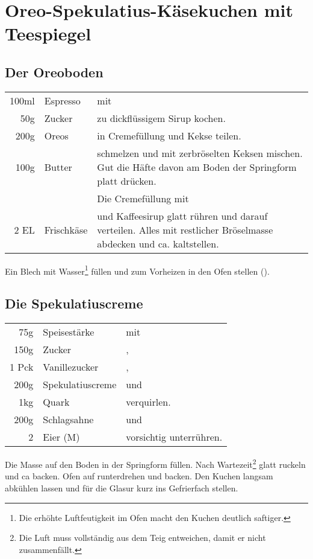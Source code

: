 \section{Oreo-Spekulatius-Käsekuchen mit Teespiegel}
\unverified
\subsection*{Der Oreoboden}
\begin{longtable}{rlL{17.7cm}}
	100ml	&	Espresso	&	mit \\
	50g		&	Zucker		&	zu dickflüssigem Sirup kochen.\\
	200g	&	Oreos		&	in Cremefüllung und Kekse teilen. \\
	100g	&	Butter		&	schmelzen und mit zerbröselten Keksen mischen. Gut die Häfte davon am Boden der Springform platt drücken. \\
			&				&	Die Cremefüllung mit  \\
	2 EL	&	Frischkäse	&	und Kaffeesirup glatt rühren und darauf verteilen. Alles mit restlicher Bröselmasse abdecken und ca.  kaltstellen. \\
\end{longtable}

Ein Blech mit Wasser\footnote{Die erhöhte Luftfeutigkeit im Ofen macht den Kuchen deutlich saftiger.\label{humidity}} füllen und zum Vorheizen in den Ofen stellen (). \\

\subsection*{Die Spekulatiuscreme}
\begin{longtable}{rlL{16.5cm}}
	75g		&	Speisestärke		&	mit \\
	150g	&	Zucker				&	, \\
	1 Pck	&	Vanillezucker		&	, \\
	200g	&	Spekulatiuscreme	&	und \\
	1kg		&	Quark				&	verquirlen. \\
	200g	&	Schlagsahne			&	und \\
	2		&	Eier (M)			&	vorsichtig unterrühren. \\
\end{longtable}

Die Masse auf den Boden in der Springform füllen. Nach  Wartezeit\footnote{Die Luft muss vollständig aus dem Teig entweichen, damit er nicht zusammenfällt.\label{wait}} glatt ruckeln und ca  backen. Ofen auf  runterdrehen und  backen. Den Kuchen langsam abkühlen lassen und für die Glasur kurz ins Gefrierfach stellen. \\

